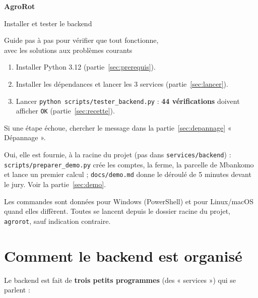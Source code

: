 \documentclass[11pt,a4paper]{article}
\begin{document}
\thispagestyle{empty}
\vspace*{2cm}
{\color{vert}\Huge\bfseries AgroRot}\par\vspace{6pt}
{\LARGE Installer et tester le backend}\par\vspace{12pt}
{\large Guide pas à pas pour vérifier que tout fonctionne,\\ avec les solutions aux problèmes courants}\par
\vspace{1.2cm}

\begin{idee}
\begin{enumerate}
\item Installer Python 3.12 (partie~\ref{sec:prerequis}).
\item Installer les dépendances et lancer les 3 services (partie~\ref{sec:lancer}).
\item Lancer \texttt{python scripts/tester\_backend.py} : \textbf{44 vérifications} doivent afficher \texttt{OK}
(partie~\ref{sec:recette}).
\end{enumerate}
Si une étape échoue, chercher le message dans la partie~\ref{sec:depannage} « Dépannage ».
\end{idee}

\begin{attention}[Et la démo ?]
Oui, elle est fournie, à la racine du projet (pas dans \texttt{services/backend}) :
\texttt{scripts/preparer\_demo.py} crée les comptes, la ferme, la parcelle de Mbankomo et lance un premier calcul ;
\texttt{docs/demo.md} donne le déroulé de 5 minutes devant le jury. Voir la partie~\ref{sec:demo}.
\end{attention}

\vfill
{\small\color{gris}Les commandes sont données pour Windows (PowerShell) et pour Linux/macOS quand elles diffèrent.
Toutes se lancent depuis le dossier racine du projet, \texttt{agrorot}, sauf indication contraire.}

\newpage
\tableofcontents
\newpage

\section{Comment le backend est organisé}

Le backend est fait de \textbf{trois petits programmes} (des « services ») qui se parlent :
\end{document}

